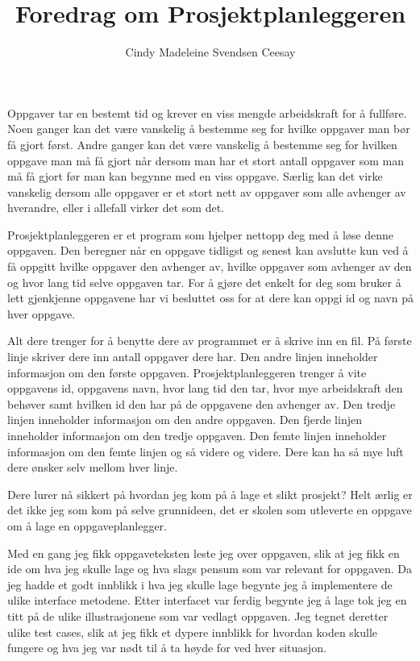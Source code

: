 \documentclass[]{article}
\title{Foredrag om Prosjektplanleggeren}
\author{Cindy Madeleine Svendsen Ceesay}
\begin{document}
\maketitle

Oppgaver tar en bestemt tid og krever en viss mengde arbeidskraft for å fullføre. Noen ganger kan det være vanskelig å bestemme seg for hvilke oppgaver man bør få gjort først. Andre ganger kan det være vanskelig å bestemme seg for hvilken oppgave man må få gjort når dersom man har et stort antall oppgaver som man må få gjort før man kan begynne med en viss oppgave. Særlig kan det virke vanskelig dersom alle oppgaver er et stort nett av oppgaver som alle avhenger av hverandre, eller i allefall virker det som det.

Prosjektplanleggeren er et program som hjelper nettopp deg med å løse denne oppgaven. Den beregner når en oppgave tidligst og senest kan avslutte kun ved å få oppgitt hvilke oppgaver den avhenger av, hvilke oppgaver som avhenger av den og hvor lang tid selve oppgaven tar. For å gjøre det enkelt for deg som bruker å lett gjenkjenne oppgavene har vi besluttet oss for at dere kan oppgi id og navn på hver oppgave.

Alt dere trenger for å benytte dere av programmet er å skrive inn en fil. På første linje skriver dere inn antall oppgaver dere har. Den andre linjen inneholder informasjon om den første oppgaven. Prosjektplanleggeren trenger å vite oppgavens id, oppgavens navn, hvor lang tid den tar, hvor mye arbeidskraft den behøver samt hvilken id den har på de oppgavene den avhenger av. Den tredje linjen inneholder informasjon om den andre oppgaven. Den fjerde linjen inneholder informasjon om den tredje oppgaven. Den femte linjen inneholder informasjon om den femte linjen og så videre og videre. Dere kan ha så mye luft dere ønsker selv mellom hver linje.

Dere lurer nå sikkert på hvordan jeg kom på å lage et slikt prosjekt? Helt ærlig er det ikke jeg som kom på selve grunnideen, det er skolen som utleverte en oppgave om å lage en oppgaveplanlegger. 

Med en gang jeg fikk oppgaveteksten leste jeg over oppgaven, slik at jeg fikk en ide om hva jeg skulle lage og hva slags pensum som var relevant for oppgaven. Da jeg hadde et godt innblikk i hva jeg skulle lage begynte jeg å implementere de ulike interface metodene. Etter interfacet var ferdig begynte jeg å lage tok jeg en titt på de ulike illustrasjonene som var vedlagt oppgaven. Jeg tegnet deretter ulike test cases, slik at jeg fikk et dypere innblikk for hvordan koden skulle fungere og hva jeg var nødt til å ta høyde for ved hver situasjon. 
\end{document}
